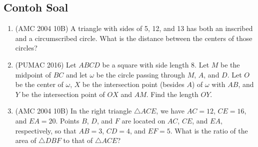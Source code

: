 \documentclass[12pt]{scrartcl}
\begin{document}
\subsection{Contoh Soal}
\begin{enumerate}
    \item (AMC 2004 10B) A triangle with sides of 5, 12, and 13 has both an inscribed and a circumscribed circle. What is the distance between the centers of those circles?
    
    \item (PUMAC 2016) Let $ABCD$ be a square with side length 8. Let $M$ be the midpoint of $BC$ and let $\omega$ be the circle passing through $M$, $A$, and $D$. Let $O$ be the center of $\omega$, $X$ be the intersection point (besides $A$) of $\omega$ with $AB$, and $Y$ be the intersection point of $OX$ and $AM$. Find the length $OY$.

    \item (AMC 2004 10B) In the right triangle $\triangle ACE$, we have $AC = 12$, $CE = 16$, and $EA = 20$. Points $B$, $D$, and $F$ are located on $AC$, $CE$, and $EA$, respectively, so that $AB = 3$, $CD = 4$, and $EF = 5$. What is the ratio of the area of $\triangle DBF$ to that of $\triangle ACE$?
\end{enumerate}
\end{document}
